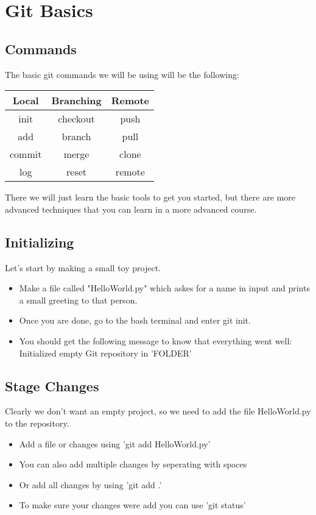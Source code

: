 \documentclass{beamer}
\begin{document}
\section{Git Basics}
\subsection{Commands}
\begin{frame}
The basic git commands we will be using will be the following:
\vspace{0.5cm}
\begin{center}
\begin{tabular}{||c|c|c||}
\hline
Local & Branching & Remote\\
\hline
\hline
init & checkout & push \\ 
\hline
add & branch & pull \\
\hline
commit & merge & clone\\
\hline
log & reset & remote\\
\hline
\end{tabular}
\end{center}
\vspace{0.5cm}
\pause
There we will just learn the basic tools to get you started, but there are more 
advanced techniques that you can learn in a more advanced course.
\end{frame}

\subsection{Initializing}
\begin{frame}
Let's start by making a small toy project.
\begin{itemize}
\item Make a file called "HelloWorld.py" which askes for a name in input and 
prints a small greeting to that person.
\item Once you are done, go to the bash terminal and enter git init.
\item You should get the following message to know that everything went 
well: Initialized empty Git repository in 'FOLDER'
\end{itemize}
\end{frame}

\subsection{Stage Changes}
\begin{frame}
Clearly we don't want an empty project, so we need to add the file 
HelloWorld.py to the repository.
\begin{itemize}
\item Add a file or changes using 'git add HelloWorld.py'
\item You can also add multiple changes by seperating with spaces
\item Or add all changes by using 'git add .'
\item To make sure your changes were add you can use 'git status'
\end{itemize}
\end{frame}
\end{document}
